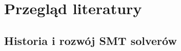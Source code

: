 \chapter{Przegląd literatury}

\section{Historia i rozwój SMT solverów}



\begin{lstlisting}
\end{lstlisting}